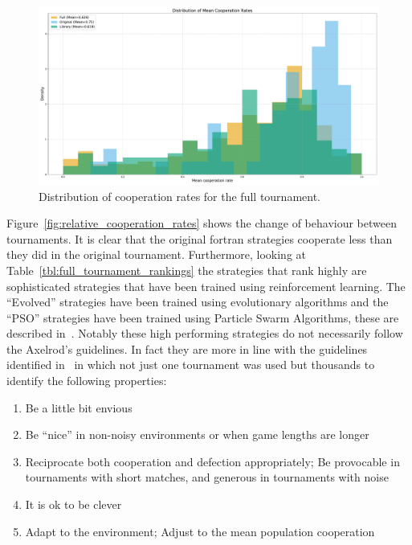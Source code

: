 \documentclass{article}
\begin{document}
\begin{figure}[!hbtp]
    \centering
    \includegraphics[width=.8\textwidth]{assets/full_tournament_cooperation_rates.pdf}
    \caption{Distribution of cooperation rates for the full tournament.}
    \label{fig:full_tournament_cooperation_rates}
\end{figure}

Figure~\ref{fig:relative_cooperation_rates} shows the change of behaviour
between tournaments. It is clear that the original fortran strategies cooperate
less than they did in the original tournament. Furthermore, looking at Table~\ref{tbl:full_tournament_rankings}
the strategies that rank highly are sophisticated strategies that have been
trained using reinforcement learning. The ``Evolved'' strategies have been
trained using evolutionary algorithms and the ``PSO'' strategies have been
trained using Particle Swarm Algorithms, these are described
in~\cite{Harper2017}. Notably these high performing strategies do not
necessarily follow the Axelrod's guidelines. In fact they are more in line with
the guidelines identified in~\cite{glynatsi2024properties} in which not just one
tournament was used but thousands to identify the following properties:

\begin{enumerate}
    \item Be a little bit envious
    \item Be ``nice'' in non-noisy environments or when game lengths are longer
    \item Reciprocate both cooperation and defection appropriately; Be provocable in tournaments with short matches, and generous in tournaments with noise
    \item It is ok to be clever
    \item Adapt to the environment; Adjust to the mean population cooperation
\end{enumerate}
\end{document}
